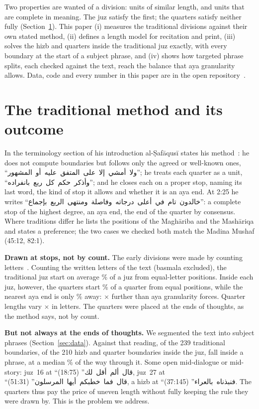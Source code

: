 \documentclass[conference]{IEEEtran}
\newcommand{\ar}[1]{\mbox{\textarabic{#1}}}
\begin{document}
Two properties are wanted of a division: units of similar length, and units that are complete in
meaning. The juz satisfy the first; the quarters satisfy neither fully (Section~\ref{sec:trad}).
This paper (i) measures the traditional divisions against their own stated method,
(ii) defines a length model for recitation and print, (iii) solves the hizb and quarters inside
the traditional juz exactly, with every boundary at the start of a subject phrase, and (iv) shows
how targeted phrase splits, each checked against the text, reach the balance that aya
granularity allows. Data, code and every number in this paper are in the open repository~\cite{repo}.

\section{The traditional method and its outcome}\label{sec:trad}
In the terminology section of his introduction al-Ṣafāqusī states his method~\cite{ghayth}: he
does not compute boundaries but follows only the agreed or well-known ones,
``\ar{ولا أمشي إلا على المتفق عليه أو المشهور}''; he treats each quarter as a unit,
``\ar{وأذكر حكم كل ربع بانفراده}''; and he closes each on a proper stop, naming its last word, the
kind of stop it allows and whether it is an aya end. At 2:25 he writes
``\ar{خالدون تام في أعلى درجاته وفاصلة ومنتهى الربع بإجماع}'': a complete stop of the highest degree,
an aya end, the end of the quarter by consensus. Where traditions differ he lists the positions
of the Maghāriba and the Mashāriqa and states a preference; the two cases we checked both
match the Madina Mushaf (45:12, 82:1).

\textbf{Drawn at stops, not by count.} The early divisions were made by counting letters~\cite{masahif,bayan}.
Counting the \Letters{} written letters of the text (basmala excluded), the traditional juz start on
average \JuzOff\% of a juz from equal-letter positions. Inside each juz, however, the quarters
start \RubOff\% of a quarter from equal positions, while the nearest aya end is only \RubFloor\%
away: \RubExcess$\times$ further than aya granularity forces. Quarter lengths vary
\RubLetterSpread$\times$ in letters. The quarters were placed at the ends of thoughts, as the method
says, not by count.

\textbf{But not always at the ends of thoughts.} We segmented the text into subject phrases
(Section~\ref{sec:data}). Against that reading, \TradCuts{} of the 239 traditional boundaries,
\TradInnerCuts{} of the 210 hizb and quarter boundaries inside the juz, fall inside a phrase,
at a median \CutDepth\% of the way through it. Some open mid-dialogue or mid-story: juz~16 at
``\ar{قال ألم أقل لك}'' (18:75), juz~27 at ``\ar{قال فما خطبكم أيها المرسلون}'' (51:31), a hizb at
``\ar{فنبذناه بالعراء}'' (37:145). The quarters thus pay the price of uneven length without
fully keeping the rule they were drawn by. This is the problem we address.
\end{document}
